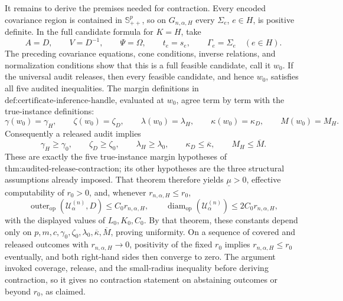 It remains to derive the premises needed for contraction. Every encoded covariance region is contained in \(\mathbb S_{++}^p\), so on \(G_{n,\alpha,H}\) every \(\Sigma_e\), \(e\in H\), is positive definite. In the full candidate formula for \(K=H\), take
\[
A=D,
\qquad V=D^{-1},
\qquad \Psi=\Omega,
\qquad t_e=s_e,
\qquad \Gamma_e=\Sigma_e\quad(e\in H).
\]
The preceding covariance equations, cone conditions, inverse relations, and normalization conditions show that this is a full feasible candidate, call it \(w_0\). If the universal audit releases, then every feasible candidate, and hence \(w_0\), satisfies all five audited inequalities. The margin definitions in \(\text{def:certificate-inference-handle}\), evaluated at \(w_0\), agree term by term with the true-instance definitions:
\[
\gamma(w_0)=\gamma_H,
\qquad
\zeta(w_0)=\zeta_D,
\qquad
\lambda(w_0)=\lambda_H,
\qquad
\kappa(w_0)=\kappa_D,
\qquad
M(w_0)=M_H.
\]
Consequently a released audit implies
\[
\gamma_H\geq\gamma_0,
\qquad
\zeta_D\geq\zeta_0,
\qquad
\lambda_H\geq\lambda_0,
\qquad
\kappa_D\leq\overline\kappa,
\qquad
M_H\leq\overline M.
\]
These are exactly the five true-instance margin hypotheses of \(\text{thm:audited-release-contraction}\); its other hypotheses are the three structural assumptions already imposed. That theorem therefore yields \(\underline\mu>0\), effective computability of \(r_0>0\), and, whenever \(r_{n,\alpha,H}\leq r_0\),
\[
\operatorname{outer}_{\mathrm{op}}(\mathcal U^{(n)}_\alpha,D)
\leq C_0r_{n,\alpha,H},
\qquad
\operatorname{diam}_{\mathrm{op}}(\mathcal U^{(n)}_\alpha)
\leq2C_0r_{n,\alpha,H},
\]
with the displayed values of \(L_0,K_0,C_0\). By that theorem, these constants depend only on \(p,m,c,\gamma_0,\zeta_0,\lambda_0,\overline\kappa,\overline M\), proving uniformity. On a sequence of covered and released outcomes with \(r_{n,\alpha,H}\to0\), positivity of the fixed \(r_0\) implies \(r_{n,\alpha,H}\leq r_0\) eventually, and both right-hand sides then converge to zero. The argument invoked coverage, release, and the small-radius inequality before deriving contraction, so it gives no contraction statement on abstaining outcomes or beyond \(r_0\), as claimed.